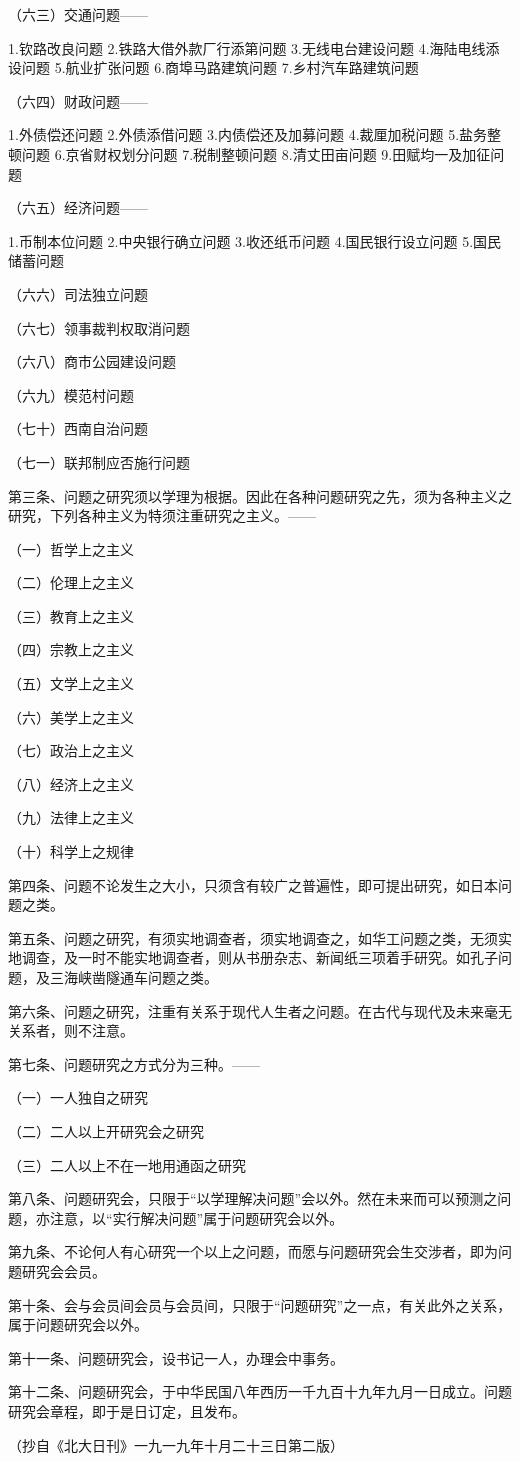 （六三）交通问题——

1.钦路改良问题
2.铁路大借外款厂行添第问题
3.无线电台建设问题
4.海陆电线添设问题
5.航业扩张问题
6.商埠马路建筑问题
7.乡村汽车路建筑问题

（六四）财政问题——

1.外债偿还问题
2.外债添借问题
3.内债偿还及加募问题
4.裁厘加税问题
5.盐务整顿问题
6.京省财权划分问题
7.税制整顿问题
8.清丈田亩问题
9.田赋均一及加征问题

（六五）经济问题——

1.币制本位问题
2.中央银行确立问题
3.收还纸币问题
4.国民银行设立问题
5.国民储蓄问题

（六六）司法独立问题

（六七）领事裁判权取消问题

（六八）商市公园建设问题

（六九）模范村问题

（七十）西南自治问题

（七一）联邦制应否施行问题

第三条、问题之研究须以学理为根据。因此在各种问题研究之先，须为各种主义之研究，下列各种主义为特须注重研究之主义。——

（一）哲学上之主义

（二）伦理上之主义

（三）教育上之主义

（四）宗教上之主义

（五）文学上之主义

（六）美学上之主义

（七）政治上之主义

（八）经济上之主义

（九）法律上之主义

（十）科学上之规律

第四条、问题不论发生之大小，只须含有较广之普遍性，即可提出研究，如日本问题之类。

第五条、问题之研究，有须实地调查者，须实地调查之，如华工问题之类，无须实地调查，及一时不能实地调查者，则从书册杂志、新闻纸三项着手研究。如孔子问题，及三海峡凿隧通车问题之类。

第六条、问题之研究，注重有关系于现代人生者之问题。在古代与现代及未来毫无关系者，则不注意。

第七条、问题研究之方式分为三种。——

（一）一人独自之研究

（二）二人以上开研究会之研究

（三）二人以上不在一地用通函之研究

第八条、问题研究会，只限于“以学理解决问题”会以外。然在未来而可以预测之问题，亦注意，以“实行解决问题”属于问题研究会以外。

第九条、不论何人有心研究一个以上之问题，而愿与问题研究会生交涉者，即为问题研究会会员。

第十条、会与会员间会员与会员间，只限于“问题研究”之一点，有关此外之关系，属于问题研究会以外。

第十一条、问题研究会，设书记一人，办理会中事务。

第十二条、问题研究会，于中华民国八年西历一千九百十九年九月一日成立。问题研究会章程，即于是日订定，且发布。

\begin{flushright}（抄自《北大日刊》一九一九年十月二十三日第二版）\end{flushright}

